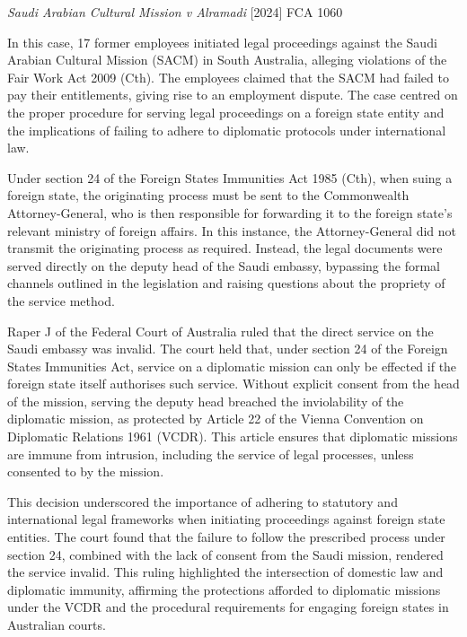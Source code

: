 \begin{casedetails}{\textit{Saudi Arabian Cultural Mission v Alramadi} [2024] FCA 1060}
    \flushleft

    In this case, 17 former employees initiated legal proceedings against the Saudi Arabian Cultural Mission (SACM) in South Australia, alleging violations of the Fair Work Act 2009 (Cth). The employees claimed that the SACM had failed to pay their entitlements, giving rise to an employment dispute. The case centred on the proper procedure for serving legal proceedings on a foreign state entity and the implications of failing to adhere to diplomatic protocols under international law.
    
    \vspace{\baselineskip}

    Under section 24 of the Foreign States Immunities Act 1985 (Cth), when suing a foreign state, the originating process must be sent to the Commonwealth Attorney-General, who is then responsible for forwarding it to the foreign state's relevant ministry of foreign affairs. In this instance, the Attorney-General did not transmit the originating process as required. Instead, the legal documents were served directly on the deputy head of the Saudi embassy, bypassing the formal channels outlined in the legislation and raising questions about the propriety of the service method.
    
    \vspace{\baselineskip}

    Raper J of the Federal Court of Australia ruled that the direct service on the Saudi embassy was invalid. The court held that, under section 24 of the Foreign States Immunities Act, service on a diplomatic mission can only be effected if the foreign state itself authorises such service. Without explicit consent from the head of the mission, serving the deputy head breached the inviolability of the diplomatic mission, as protected by Article 22 of the Vienna Convention on Diplomatic Relations 1961 (VCDR). This article ensures that diplomatic missions are immune from intrusion, including the service of legal processes, unless consented to by the mission.
    
    \vspace{\baselineskip}

    This decision underscored the importance of adhering to statutory and international legal frameworks when initiating proceedings against foreign state entities. The court found that the failure to follow the prescribed process under section 24, combined with the lack of consent from the Saudi mission, rendered the service invalid. This ruling highlighted the intersection of domestic law and diplomatic immunity, affirming the protections afforded to diplomatic missions under the VCDR and the procedural requirements for engaging foreign states in Australian courts.
\end{casedetails}

